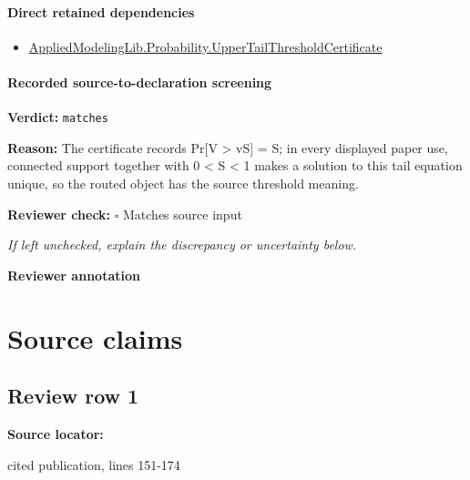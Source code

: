 \documentclass[10pt]{article}
\newcommand{\reviewerbox}{%
  \par\noindent\fbox{\parbox{0.96\linewidth}{\rule{0pt}{0.38in}}}\par
}
\newcommand{\reviewmatch}[1]{%
  \par\noindent\textbf{Reviewer check:} $\square$\; #1\par
  \noindent\emph{If left unchecked, explain the discrepancy or uncertainty below.}\par
}
\begin{document}
\paragraph{Direct retained dependencies}
\begin{itemize}\raggedright
\item \hyperlink{governing-declaration-2263f12906624ef5}{Applied\allowbreak{}Modeling\allowbreak{}Lib.\allowbreak{}Probability.\allowbreak{}Upper\allowbreak{}Tail\allowbreak{}Threshold\allowbreak{}Certificate}
\end{itemize}
\paragraph{Recorded source-to-declaration screening}
\textbf{Verdict:} \texttt{matches}
\\
{\raggedright
\textbf{Reason:} The certificate records Pr[V > vS] = S;\allowbreak{} in every displayed paper use, connected support together with 0 < S < 1 makes a solution to this tail equation unique, so the routed object has the source threshold meaning.\allowbreak{}
\par}
\reviewmatch{Matches source input}
\noindent\textbf{Reviewer annotation}\par
\reviewerbox

\clearpage
\hypertarget{source-claim-fb68d50156e6ff17}{}
\hypertarget{source-section-f10b5f68e4acf3dc}{}
\section*{Source claims}
\subsection*{Review row 1}
\textbf{Source locator:} {\footnotesize\raggedright cited publication, lines 151-\allowbreak{}174\par}
\end{document}
